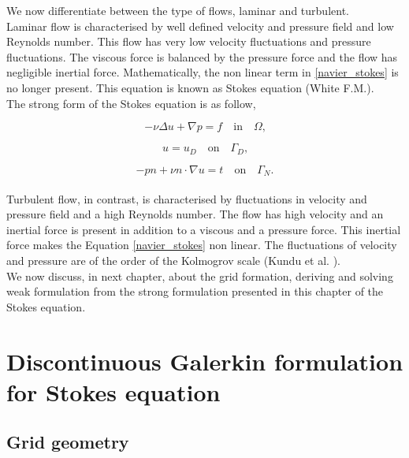 \documentclass[a4paper,oneside,openright,spanish,english]{book}
\begin{document}
We now differentiate between the type of flows, laminar and turbulent.\\

Laminar flow is characterised by well defined velocity and pressure field and low Reynolds number. This flow has very low velocity fluctuations and pressure fluctuations. The viscous force is balanced by the pressure force and the flow has negligible inertial force. Mathematically, the non linear term in \eqref{navier_stokes} is no longer present. This equation is known as Stokes equation (White F.M.\cite{white}).\\

The strong form of the Stokes equation is as follow,

\begin{equation} \label{stokes_strong_form}
-\nu \Delta u + \nabla p = f \quad \textrm{in} \quad \Omega \textrm{,}
\end{equation}

\begin{equation} \label{dirichlet condition stokes}
u = u_D \quad \textrm{on} \quad \Gamma_D \textrm{,}
\end{equation}

\begin{equation} \label{neumann condition stokes}
-pn + \nu n \cdot \nabla u = t \quad \textrm{on} \quad \Gamma_N \textrm{.}
\end{equation}
\\

Turbulent flow, in contrast, is characterised by fluctuations in velocity and pressure field and a high Reynolds number. The flow has high velocity and an inertial force is present in addition to a viscous and a pressure force. This inertial force makes the Equation \eqref{navier_stokes} non linear. The fluctuations of velocity and pressure are of the order of the Kolmogrov scale (Kundu et al. \cite{Kundu}).\\

We now discuss, in next chapter, about the grid formation, deriving and solving weak formulation from the strong formulation presented in this chapter of the Stokes equation.


\chapter[DG formulation for the Stokes equation]{Discontinuous Galerkin formulation for Stokes equation}

\section{Grid geometry}
\end{document}
